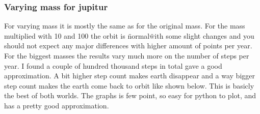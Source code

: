 \subsubsection{Varying mass for jupitur}

For varying mass it is mostly the same as for the original mass. For the mass multiplied with 10 and 100 the orbit is \"normal\" with some slight changes and you should not expect any major differences with higher amount of points per year. For the biggest masses the results vary much more on the number of steps per year. I found a couple of hundred thousand steps in total gave a good approximation. A bit higher step count makes earth disappear and a way bigger step count makes the earth come back to orbit like shown below. This is basicly the best of both worlds. The graphs is few point, so easy for python to plot, and has a pretty good approximation.

